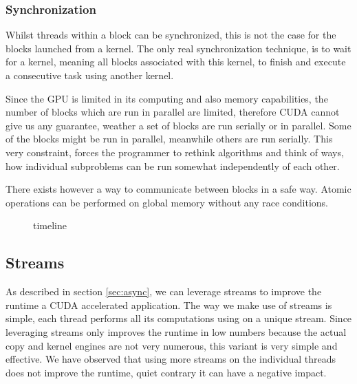 \documentclass[]{article}
\begin{document}
\subsubsection{Synchronization}

Whilst threads within a block can be synchronized, this is not the case for the blocks launched from a kernel. The only real synchronization technique, is to wait for a kernel, meaning all blocks associated with this kernel, to finish and execute a consecutive task using another kernel. 

Since the GPU is limited in its computing and also memory capabilities, the number of blocks which are run in parallel are limited, therefore CUDA cannot give us any guarantee, weather a set of blocks are run serially or in parallel. Some of the blocks might be run in parallel, meanwhile others are run serially. This very constraint, forces the programmer to rethink algorithms and think of ways, how individual subproblems can be run somewhat independently of each other. 

There exists however a way to communicate between blocks in a safe way. Atomic operations can be performed on global memory without any race conditions.
\begin{figure}
	\begin{center}
	\end{center}
	\caption{timeline}
	\label{u}
\end{figure}

\subsection{Streams}

As described in section \ref{sec:async}, we can leverage streams to improve the runtime a CUDA accelerated application. The way we make use of streams is simple, each thread performs all its computations using on a unique stream. Since leveraging streams only improves the runtime in low numbers because the actual copy and kernel engines are not very numerous, this variant is very simple and effective. We have observed that using more streams on the individual threads does not improve the runtime, quiet contrary it can have a negative impact. 
\end{document}
